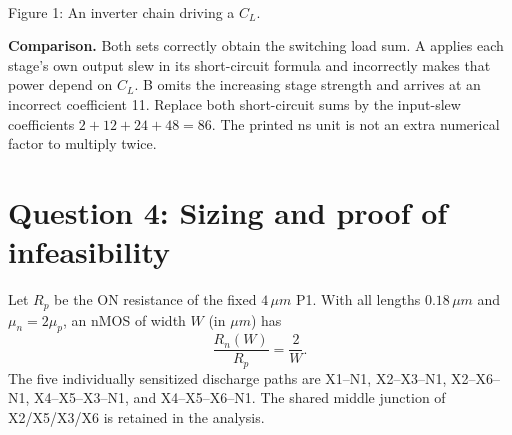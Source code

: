 \documentclass[10pt]{article}
\newcommand{\mos}[4]{\begin{scope}[shift={(#1,#2)}]
\draw(0,.24)--(0,-.24);\draw(0,.2)--(.25,.2)--(.25,.5);\draw(0,-.2)--(.25,-.2)--(.25,-.5);
\draw(-.16,.23)--(-.16,-.23);
\ifnum#4=1\draw(-.26,0)circle(.06);\draw(-.75,0)--(-.32,0);\else\draw(-.75,0)--(-.16,0);\fi
\node[anchor=east,font=\scriptsize]at(-.76,0){$#3$};\end{scope}}
\newcommand{\gnd}[2]{\draw(#1,#2)--(#1,{#2-.12});\draw({#1-.17},{#2-.12})--({#1+.17},{#2-.12});\draw({#1-.11},{#2-.2})--({#1+.11},{#2-.2});}
\newcommand{\rail}[3]{\draw(#1,#2)--(#1,{#2+.14});\node[above,font=\scriptsize]at(#1,{#2+.14}){$#3$};}
\begin{document}
\begin{center}\\Figure 1: An inverter chain driving a $C_L$.\end{center}
\textbf{Comparison.} Both sets correctly obtain the switching load sum. A applies each stage's own output slew in its short-circuit formula and incorrectly makes that power depend on $C_L$. B omits the increasing stage strength and arrives at an incorrect coefficient 11. Replace both short-circuit sums by the input-slew coefficients $2+12+24+48=86$. The printed ns unit is not an extra numerical factor to multiply twice.

\newpage\section*{Question 4: Sizing and proof of infeasibility}
Let $R_p$ be the ON resistance of the fixed $4\,\mu m$ P1. With all lengths $0.18\,\mu m$ and $\mu_n=2\mu_p$, an nMOS of width $W$ (in $\mu m$) has
\[\frac{R_n(W)}{R_p}=\frac{2}{W}.\]
The five individually sensitized discharge paths are X1--N1, X2--X3--N1, X2--X6--N1, X4--X5--X3--N1, and X4--X5--X6--N1. The shared middle junction of X2/X5/X3/X6 is retained in the analysis.
\end{document}
